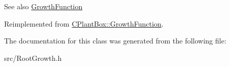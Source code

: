 \begin{DoxySeeAlso}{See also}
\hyperlink{classCPlantBox_1_1GrowthFunction}{Growth\+Function} 
\end{DoxySeeAlso}


Reimplemented from \hyperlink{classCPlantBox_1_1GrowthFunction_a41b83da5d75beab49846c5b92a421e43}{C\+Plant\+Box\+::\+Growth\+Function}.



The documentation for this class was generated from the following file\+:\begin{DoxyCompactItemize}
\item 
src/Root\+Growth.\+h\end{DoxyCompactItemize}
